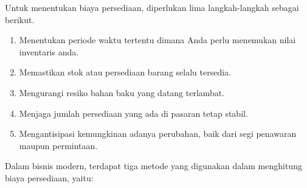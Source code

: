 Untuk menentukan biaya persediaan, diperlukan lima langkah-langkah sebagai berikut.

\begin{enumerate}
	\item Menentukan periode waktu tertentu dimana Anda perlu menemukan nilai inventaris anda.
	\item Memastikan stok atau persediaan barang selalu tersedia.
	\item Mengurangi resiko bahan baku yang datang terlambat.
	\item Menjaga jumlah persediaan yang ada di pasaran tetap stabil.
	\item Mengantisipasi kemungkinan adanya perubahan, baik dari segi penawaran maupun permintaan.
\end{enumerate}

Dalam bisnis modern, terdapat tiga metode yang digunakan dalam menghitung biaya persediaan, yaitu:

